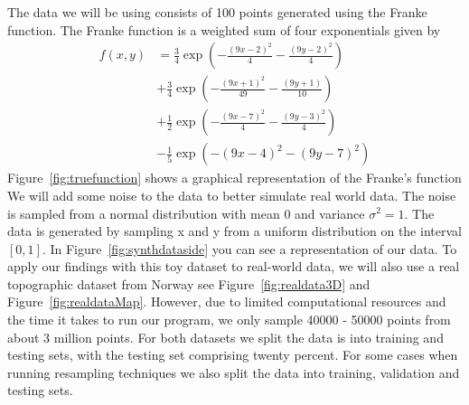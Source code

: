 \documentclass[twoside,11pt]{report}
\begin{document}
The data we will be using consists of 100 points generated using the Franke function. The Franke function is a weighted sum of four exponentials given by
\begin{align*}
    f(x,y) &= \frac{3}{4}\exp\left(-\frac{(9x-2)^2}{4}-\frac{(9y-2)^2}{4}\right)\\
    &+ \frac{3}{4}\exp\left(-\frac{(9x+1)^2}{49}-\frac{(9y+1)}{10}\right)\\
    &+ \frac{1}{2}\exp\left(-\frac{(9x-7)^2}{4}-\frac{(9y-3)^2}{4}\right)\\
    &- \frac{1}{5}\exp\left(-(9x-4)^2-(9y-7)^2\right)
\end{align*}
Figure~\ref{fig:truefunction} shows a graphical representation of the Franke's function\\
We will add some noise to the data to better simulate real world data. 
The noise is sampled from a normal distribution with mean 0 and variance $\sigma^2 = 1$.
The data is generated by sampling x and y from a uniform distribution on the interval $[0, 1]$.
In Figure~\ref{fig:synthdataside} you can see a representation of our data.
To apply our findings with this toy dataset to real-world data, we will also use a 
real topographic dataset from Norway see Figure~\ref{fig:realdata3D} and Figure~\ref{fig:realdataMap}. 
However, due to limited computational resources and the time it takes to run our program, we only sample 
40000 - 50000 points from about 3 million points. For both datasets we split the data is into 
training and testing sets, with the testing set comprising twenty percent. For some cases when running
resampling techniques we also split the data into training, validation and testing sets.
\end{document}
